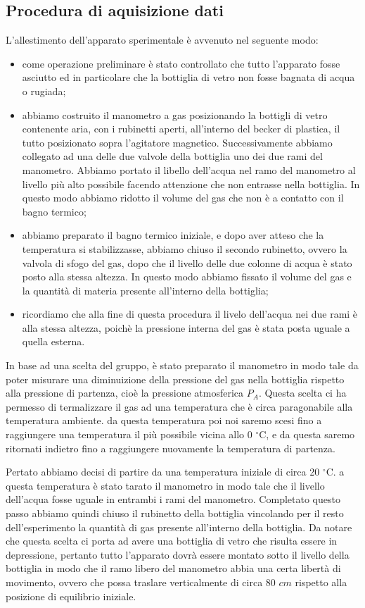 \subsection{Procedura di aquisizione dati}
L'allestimento dell'apparato sperimentale è avvenuto nel seguente modo:

\begin{itemize}
	\item{come operazione preliminare è stato controllato che tutto l'apparato fosse asciutto ed in particolare che la bottiglia di vetro non fosse bagnata di acqua o rugiada;}
	\item{abbiamo costruito il manometro a gas posizionando la bottigli di vetro contenente aria, con i rubinetti aperti, all'interno del becker di plastica, il tutto posizionato sopra l'agitatore magnetico. Successivamente abbiamo collegato ad una delle due valvole della bottiglia uno dei due rami del manometro. Abbiamo portato il libello dell'acqua nel ramo del manometro al livello più alto possibile facendo attenzione che non entrasse nella bottiglia. In questo modo abbiamo ridotto il volume del gas che non è a contatto con il bagno termico;}
	\item{abbiamo preparato il bagno termico iniziale, e dopo aver atteso che la temperatura si stabilizzasse, abbiamo chiuso il secondo rubinetto, ovvero la valvola di sfogo del gas, dopo che il livello delle due colonne di acqua è stato posto alla stessa altezza. In questo modo abbiamo fissato il volume del gas e la quantità di materia presente all'interno della bottiglia;}
	\item{ricordiamo che alla fine di questa procedura il livelo dell'acqua nei due rami è alla stessa altezza, poichè la pressione interna del gas è stata posta uguale a quella esterna.}
\end{itemize}
%

In base ad una scelta del gruppo, è stato preparato il manometro in modo tale da poter misurare una diminuizione della pressione del gas nella bottiglia rispetto alla pressione di partenza, cioè la pressione atmosferica $P_A$. Questa scelta ci ha permesso di termalizzare il gas ad una temperatura che è circa paragonabile alla temperatura ambiente. da questa temperatura poi noi saremo scesi fino a raggiungere una temperatura il più possibile vicina allo 0 $^\circ$C, e da questa saremo ritornati indietro fino a raggiungere nuovamente la temperatura di partenza.

Pertato abbiamo decisi di partire da una temperatura iniziale di circa 20 $^\circ$C. a questa temperatura è stato tarato il manometro in modo tale che il livello dell'acqua fosse uguale in entrambi i rami del manometro. Completato questo passo abbiamo quindi chiuso il rubinetto della bottiglia vincolando per il resto dell'esperimento la quantità di gas presente all'interno della bottiglia. Da notare che questa scelta ci porta ad avere una bottiglia di vetro che risulta essere in depressione, pertanto tutto l'apparato dovrà essere montato sotto il livello della bottiglia in modo che il ramo libero del manometro abbia una certa libertà di movimento, ovvero che possa traslare verticalmente di circa 80 $cm$ rispetto alla posizione di equilibrio iniziale.

